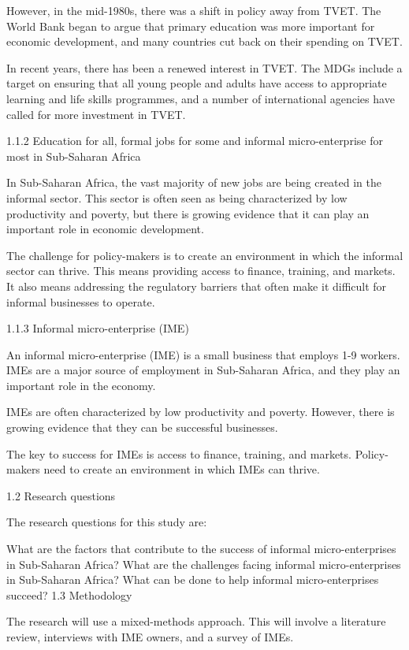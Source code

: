 \documentclass[
  a4paper, twoside, 12pt]{book}
\begin{document}
However, in the mid-1980s, there was a shift in policy away from TVET. The World Bank began to argue that primary education was more important for economic development, and many countries cut back on their spending on TVET.

In recent years, there has been a renewed interest in TVET. The MDGs include a target on ensuring that all young people and adults have access to appropriate learning and life skills programmes, and a number of international agencies have called for more investment in TVET.

1.1.2 Education for all, formal jobs for some and informal micro-enterprise for most in Sub-Saharan Africa

In Sub-Saharan Africa, the vast majority of new jobs are being created in the informal sector. This sector is often seen as being characterized by low productivity and poverty, but there is growing evidence that it can play an important role in economic development.

The challenge for policy-makers is to create an environment in which the informal sector can thrive. This means providing access to finance, training, and markets. It also means addressing the regulatory barriers that often make it difficult for informal businesses to operate.

1.1.3 Informal micro-enterprise (IME)

An informal micro-enterprise (IME) is a small business that employs 1-9 workers. IMEs are a major source of employment in Sub-Saharan Africa, and they play an important role in the economy.

IMEs are often characterized by low productivity and poverty. However, there is growing evidence that they can be successful businesses.

The key to success for IMEs is access to finance, training, and markets. Policy-makers need to create an environment in which IMEs can thrive.

1.2 Research questions

The research questions for this study are:

What are the factors that contribute to the success of informal micro-enterprises in Sub-Saharan Africa?
What are the challenges facing informal micro-enterprises in Sub-Saharan Africa?
What can be done to help informal micro-enterprises succeed?
1.3 Methodology

The research will use a mixed-methods approach. This will involve a literature review, interviews with IME owners, and a survey of IMEs.
\end{document}
